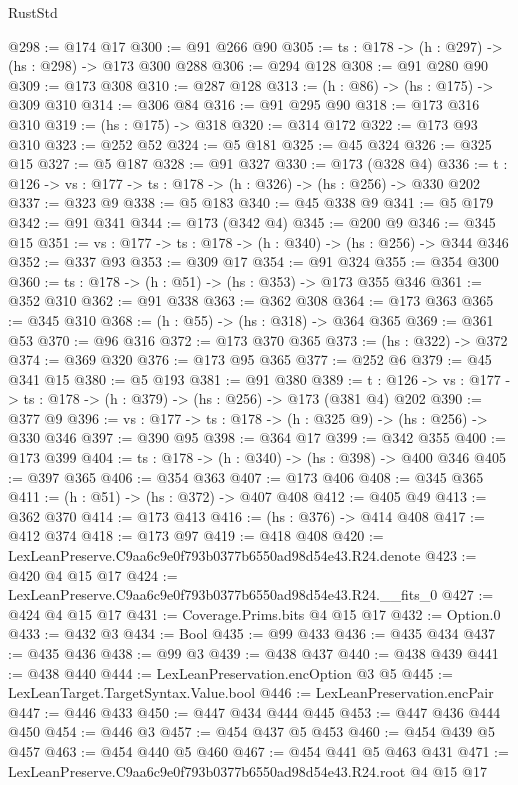 \begin{lexlean}{RustStd}
\begin{coremodule}
@298 := @174 @17
@300 := @91 @266 @90
@305 := {ts : @178} -> (h : @297) -> (hs : @298) -> @173 @300 @288
@306 := @294 @128
@308 := @91 @280 @90
@309 := @173 @308
@310 := @287 @128
@313 := (h : @86) -> (hs : @175) -> @309 @310
@314 := @306 @84
@316 := @91 @295 @90
@318 := @173 @316 @310
@319 := (hs : @175) -> @318
@320 := @314 @172
@322 := @173 @93 @310
@323 := @252 @52
@324 := @5 @181
@325 := @45 @324
@326 := @325 @15
@327 := @5 @187
@328 := @91 @327
@330 := @173 (@328 @4)
@336 := {t : @126} -> {vs : @177} -> {ts : @178} -> (h : @326) -> (hs : @256) -> @330 @202
@337 := @323 @9
@338 := @5 @183
@340 := @45 @338 @9
@341 := @5 @179
@342 := @91 @341
@344 := @173 (@342 @4)
@345 := @200 @9
@346 := @345 @15
@351 := {vs : @177} -> {ts : @178} -> (h : @340) -> (hs : @256) -> @344 @346
@352 := @337 @93
@353 := @309 @17
@354 := @91 @324
@355 := @354 @300
@360 := {ts : @178} -> (h : @51) -> (hs : @353) -> @173 @355 @346
@361 := @352 @310
@362 := @91 @338
@363 := @362 @308
@364 := @173 @363
@365 := @345 @310
@368 := (h : @55) -> (hs : @318) -> @364 @365
@369 := @361 @53
@370 := @96 @316
@372 := @173 @370 @365
@373 := (hs : @322) -> @372
@374 := @369 @320
@376 := @173 @95 @365
@377 := @252 @6
@379 := @45 @341 @15
@380 := @5 @193
@381 := @91 @380
@389 := {t : @126} -> {vs : @177} -> {ts : @178} -> (h : @379) -> (hs : @256) -> @173 (@381 @4) @202
@390 := @377 @9
@396 := {vs : @177} -> {ts : @178} -> (h : @325 @9) -> (hs : @256) -> @330 @346
@397 := @390 @95
@398 := @364 @17
@399 := @342 @355
@400 := @173 @399
@404 := {ts : @178} -> (h : @340) -> (hs : @398) -> @400 @346
@405 := @397 @365
@406 := @354 @363
@407 := @173 @406
@408 := @345 @365
@411 := (h : @51) -> (hs : @372) -> @407 @408
@412 := @405 @49
@413 := @362 @370
@414 := @173 @413
@416 := (hs : @376) -> @414 @408
@417 := @412 @374
@418 := @173 @97
@419 := @418 @408
@420 := LexLeanPreserve.C9aa6c9e0f793b0377b6550ad98d54e43.R24.denote
@423 := @420 @4 @15 @17
@424 := LexLeanPreserve.C9aa6c9e0f793b0377b6550ad98d54e43.R24.__fits_0
@427 := @424 @4 @15 @17
@431 := Coverage.Prims.bits @4 @15 @17
@432 := Option.{0}
@433 := @432 @3
@434 := Bool
@435 := @99 @433
@436 := @435 @434
@437 := @435 @436
@438 := @99 @3
@439 := @438 @437
@440 := @438 @439
@441 := @438 @440
@444 := LexLeanPreservation.encOption @3 @5
@445 := LexLeanTarget.TargetSyntax.Value.bool
@446 := LexLeanPreservation.encPair
@447 := @446 @433
@450 := @447 @434 @444 @445
@453 := @447 @436 @444 @450
@454 := @446 @3
@457 := @454 @437 @5 @453
@460 := @454 @439 @5 @457
@463 := @454 @440 @5 @460
@467 := @454 @441 @5 @463 @431
@471 := LexLeanPreserve.C9aa6c9e0f793b0377b6550ad98d54e43.R24.root @4 @15 @17

\end{coremodule}
\end{lexlean}
